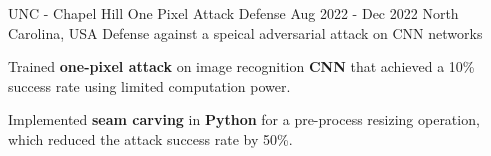 

\begin{cventries}

  \cventry
    {UNC - Chapel Hill} %
    {One Pixel Attack Defense} %
    {Aug 2022 - Dec 2022} %
    {North Carolina, USA} %
    {Defense against a speical adversarial attack on CNN networks}
    {
      \begin{cvitems} %
        \item {Trained \textbf{one-pixel attack} on image recognition \textbf{CNN} that achieved a 10\% success rate using limited computation power.}
        \item {Implemented \textbf{seam carving} in \textbf{Python} for a pre-process resizing operation, which reduced the attack success rate by 50\%.}
      \end{cvitems}
    }


\end{cventries}
